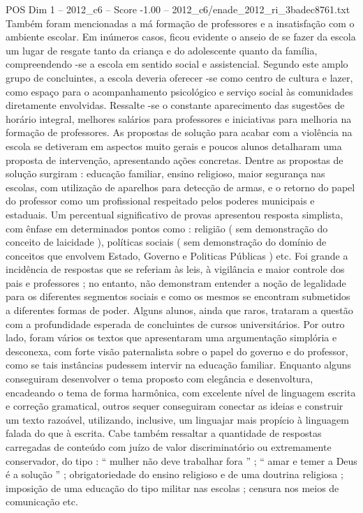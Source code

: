 \begin{textsample}{POS Dim 1 – 2012\_c6 – Score -1.00 – 2012\_c6/enade\_2012\_ri\_3badec8761.txt}
Também foram mencionadas a má formação de professores e a insatisfação com o ambiente escolar.
Em inúmeros casos, ficou evidente o anseio de se fazer da escola um lugar de resgate tanto da criança e do adolescente quanto da família, compreendendo -se a escola em sentido social e assistencial.
Segundo este amplo grupo de concluintes, a escola deveria oferecer -se como centro de cultura e lazer, como espaço para o acompanhamento psicológico e serviço social às comunidades diretamente envolvidas.
Ressalte -se o constante aparecimento das sugestões de horário integral, melhores salários para professores e iniciativas para melhoria na formação de professores.
As propostas de solução para acabar com a violência na escola se detiveram em aspectos muito gerais e poucos alunos detalharam uma proposta de intervenção, apresentando ações concretas.
Dentre as propostas de solução surgiram : educação familiar, ensino religioso, maior segurança nas escolas, com utilização de aparelhos para detecção de armas, e o retorno do papel do professor como um profissional respeitado pelos poderes municipais e estaduais.
Um percentual significativo de provas apresentou resposta simplista, com ênfase em determinados pontos como : religião ( sem demonstração do conceito de laicidade ), políticas sociais ( sem demonstração do domínio de conceitos que envolvem Estado, Governo e Politicas Públicas ) etc.
Foi grande a incidência de respostas que se referiam às leis, à vigilância e maior controle dos pais e professores ; no entanto, não demonstram entender a noção de legalidade para os diferentes segmentos sociais e como os mesmos se encontram submetidos a diferentes formas de poder.
Alguns alunos, ainda que raros, trataram a questão com a profundidade esperada de concluintes de cursos universitários.
Por outro lado, foram vários os textos que apresentaram uma argumentação simplória e desconexa, com forte visão paternalista sobre o papel do governo e do professor, como se tais instâncias pudessem intervir na educação familiar.
Enquanto alguns conseguiram desenvolver o tema proposto com elegância e desenvoltura, encadeando o tema de forma harmônica, com excelente nível de linguagem escrita e correção gramatical, outros sequer conseguiram conectar as ideias e construir um texto razoável, utilizando, inclusive, um linguajar mais propício à linguagem falada do que à escrita.
Cabe também ressaltar a quantidade de respostas carregadas de conteúdo com juízo de valor discriminatório ou extremamente conservador, do tipo : “ mulher não deve trabalhar fora ” ; “ amar e temer a Deus é a solução ” ; obrigatoriedade do ensino religioso e de uma doutrina religiosa ; imposição de uma educação do tipo militar nas escolas ; censura nos meios de comunicação etc.

\end{textsample}
